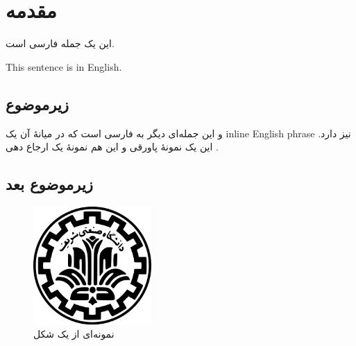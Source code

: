 \documentclass[12pt]{article}
\begin{document}
	\section{مقدمه}
	
	این یک جمله فارسی است.
	
	\begin{english}
		This sentence is in English.
	\end{english}
	
	\subsection{زیرموضوع}
	
	و این جمله‌ای دیگر به فارسی است که در میانهٔ آن یک \textenglish{inline English phrase} نیز دارد.  
	این یک نمونهٔ پاورقی و این هم نمونهٔ یک ارجاع دهی
	\cite{kurose2017}.
	\subsection{زیرموضوع بعد}
	
	\begin{figure}[h]
		\centering
		\includegraphics[width=0.4\textwidth]{sharif.png}
		\caption{نمونه‌ای از یک شکل}
	\end{figure}
	
	\newpage
	\begin{LTR}
		\printbibliography[title={مراجع}]
	\end{LTR}

	
\end{document}
